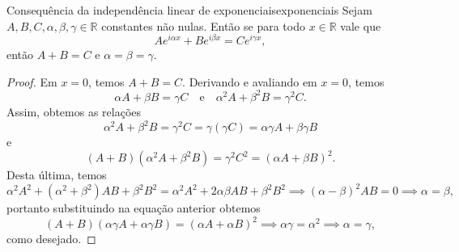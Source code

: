 \begin{lemma}{Consequência da independência linear de exponenciais}{exponenciais}
    Sejam \(A, B, C, \alpha, \beta, \gamma \in \mathbb{R}\) constantes não nulas. Então se para todo \(x \in \mathbb{R}\) vale que
    \begin{equation*}
        A e^{i\alpha x} + B e^{i \beta x} = C e^{i \gamma x},
    \end{equation*}
    então \(A + B = C\) e \(\alpha = \beta = \gamma\).
\end{lemma}
\begin{proof}
    Em \(x = 0\), temos \(A + B = C\). Derivando e avaliando em \(x = 0\), temos
    \begin{equation*}
        \alpha A + \beta B = \gamma C \quad\text{e}\quad \alpha^2A + \beta^2B = \gamma^2C.
    \end{equation*}
    Assim, obtemos as relações
    \begin{equation*}
        \alpha^2 A + \beta^2 B = \gamma^2 C = \gamma (\gamma C) = \alpha\gamma A + \beta \gamma B
    \end{equation*}
    e
    \begin{equation*}
        (A + B)(\alpha^2 A + \beta^2 B) = \gamma^2 C^2 = (\alpha A + \beta B)^2.
    \end{equation*}
    Desta última, temos
    \begin{equation*}
        \alpha^2 A^2 + (\alpha^2 + \beta^2) AB + \beta^2 B^2 = \alpha^2 A^2 + 2 \alpha \beta AB + \beta^2 B^2 \implies (\alpha - \beta)^2 AB = 0 \implies \alpha = \beta,
    \end{equation*}
    portanto substituindo na equação anterior obtemos
    \begin{equation*}
        (A + B)(\alpha \gamma A + \alpha \gamma B) = (\alpha A + \alpha B)^2 \implies \alpha \gamma = \alpha^2 \implies \alpha = \gamma,
    \end{equation*}
    como desejado.
\end{proof}

